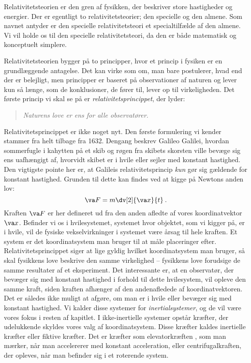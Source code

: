 Relativitetsteorien er den gren af fysikken, der beskriver store hastigheder og energier. Der er egentligt to relativitetsteorier; den specielle og den almene.
Som navnet antyder er den specielle relativitetsteori et specialtilfælde af den almene.
Vi vil holde os til den specielle relativitetsteori, da den er både matematisk og konceptuelt simplere.

Relativitetsteorien bygger på to principper, hvor et princip i fysiken er en grundlæggende antagelse.
Det kan virke som om, man bare postulerer, hvad end der er belejligt, men principper er baseret på observationer af naturen og lever kun så længe, som de konklusioner, de fører til, lever op til virkeligheden.
Det første princip vi skal se på er {\em relativitetsprincippet}, der lyder:
%
\begin{quote}
    \emph{Naturens love er ens for alle observatører.}
\end{quote}
%
Relativitetsprincippet er ikke noget nyt. Den første formulering vi kender stammer fra helt tilbage fra 1632.
Dengang beskrev Galileo Galilei, hvordan sommerfugle i kahytten på et skib og røgen fra skibets skorsten ville bevæge sig ens uafhængigt af, hvorvidt skibet er i hvile eller sejler med konstant hastighed. \\
Den vigtigste pointe her er, at Galileis relativitetsprincip {\em kun} gør sig gældende for konstant hastighed.
Grunden til dette kan findes ved at kigge på Newtons anden lov:
$$
\va F=m\dv[2]{\va x}{t} \: .
$$
Kraften $\va F$ er her defineret ud fra den anden afledte af vores koordinatvektor $\va x$.
Befinder vi os i hvilesystemet, systemet hvor objektet, som vi kigger på, er i hvile, vil de fysiske vekselvirkninger i systemet være årsag til hele kraften. Et system er det koordinatsystem man bruger til at måle placeringer efter. Relativitetsprincippet siger at lige gyldig hvilket koordinatsystem man bruger, så skal fysikkens love beskrive den samme virkelighed -- fysikkens love forudsige de samme resultater af et eksperiment.
Det interessante er, at en observatør, der bevæger sig med konstant hastighed i forhold til dette hvilesystem, vil opleve den samme kraft, siden kraften afhænger af den andenafledede af koordinatvektoren.
Det er således ikke muligt at afgøre, om man er i hvile eller bevæger sig med konstant hastighed.
Vi kalder disse systemer for {\em inertialsystemer}, og de vil være vores fokus i resten af kapitlet.
I ikke-inertielle systemer opstår kræfter, der udelukkende skyldes vores valg af koordinatsystem.
Disse kræfter kaldes inertielle kræfter eller fiktive kræfter.
Det er kræfter som elevatorkræften%
, som man mærker, når man accelererer med konstant acceleration, eller centrifugalkraften, der opleves, når man befinder sig i et roterende system.

